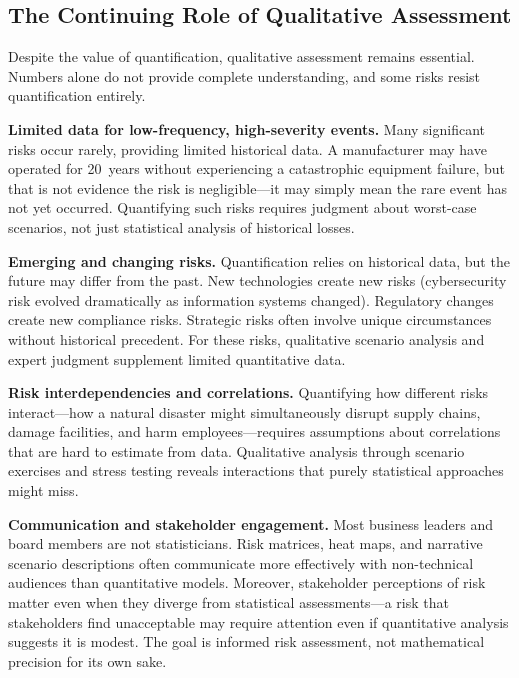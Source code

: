 \documentclass[11pt,openany]{book}
\begin{document}
\subsection{The Continuing Role of Qualitative Assessment}
\label{subsec:qualitative-role}

Despite the value of quantification, qualitative assessment remains essential.
Numbers alone do not provide complete understanding, and some risks resist
quantification entirely.

\textbf{Limited data for low-frequency, high-severity events.} Many significant
risks occur rarely, providing limited historical data. A manufacturer may have
operated for 20~years without experiencing a catastrophic equipment failure, but
that is not evidence the risk is negligible---it may simply mean the rare event
has not yet occurred. Quantifying such risks requires judgment about worst-case
scenarios, not just statistical analysis of historical losses.

\textbf{Emerging and changing risks.} Quantification relies on historical data,
but the future may differ from the past. New technologies create new risks
(cybersecurity risk evolved dramatically as information systems changed).
Regulatory changes create new compliance risks. Strategic risks often involve
unique circumstances without historical precedent. For these risks, qualitative
scenario analysis and expert judgment supplement limited quantitative data.

\textbf{Risk interdependencies and correlations.} Quantifying how different
risks interact---how a natural disaster might simultaneously disrupt supply
chains, damage facilities, and harm employees---requires assumptions about
correlations that are hard to estimate from data. Qualitative analysis through
scenario exercises and stress testing reveals interactions that purely
statistical approaches might miss.

\textbf{Communication and stakeholder engagement.} Most business leaders and
board members are not statisticians. Risk matrices, heat maps, and narrative
scenario descriptions often communicate more effectively with non-technical
audiences than quantitative models. Moreover, stakeholder perceptions of risk
matter even when they diverge from statistical assessments---a risk that
stakeholders find unacceptable may require attention even if quantitative
analysis suggests it is modest. The goal is informed risk assessment, not
mathematical precision for its own sake.
\end{document}
